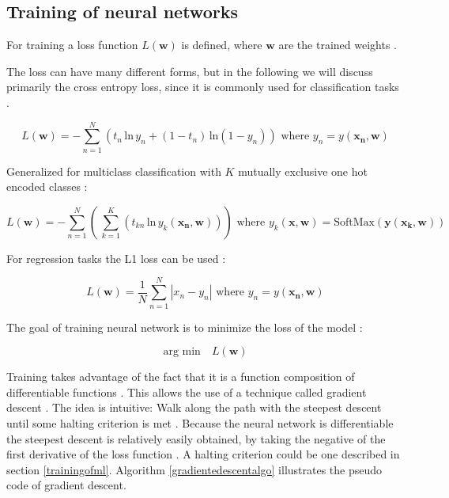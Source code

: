 \documentclass[draft,final,oneside]{vutinfth} %
\begin{document}
\subsection{Training of neural networks} \label{nntrain}

For training a loss function $L(\boldsymbol{w})$ is defined, where $\boldsymbol{w}$ are the trained weights \cite{Goodfellow-et-al-2016}.

The loss can have many different forms, but in the following we will discuss primarily the cross entropy loss, since it is commonly used for classification tasks \cite{dlvc}.

\begin{equation}
L(\boldsymbol{w}) = -\sum_{n=1}^N \left( t_n\,\text{ln}\, y_n + (1 - t_n)\,\text{ln}(1 - y_n)\right) \text{ where } 
y_n = y(\boldsymbol{x_n}, \boldsymbol{w})
\end{equation}

Generalized for multiclass classification with $K$ mutually exclusive one hot encoded classes \cite{dlvc}:

\begin{equation}
L(\boldsymbol{w}) = -\sum_{n=1}^N \left(\,\sum_{k=1}^K \left(t_{kn}\,\text{ln}\,y_k(\boldsymbol{x_n},\boldsymbol{w})\right)\right) \text{ where } y_k(\boldsymbol{x}, \boldsymbol{w}) = \text{SoftMax}(\boldsymbol{y}(\boldsymbol{x_k}, \boldsymbol{w}))
\end{equation}

For regression tasks the L1 loss can be used \cite{accuracy}:

\begin{equation}
L(\boldsymbol{w}) = \dfrac{1}{N} \sum_{n=1}^N |x_n - y_n| \text{ where } 
y_n = y(\boldsymbol{x_n}, \boldsymbol{w})
\end{equation}

The goal of training neural network is to minimize the loss of the model \cite{dlvc}:

\begin{equation}
\text{arg min}\quad L(\boldsymbol{w})
\end{equation}

Training takes advantage of the fact that it is a function composition of differentiable functions \cite{Goodfellow-et-al-2016}. This allows the use of a technique called gradient descent \cite{anintroductiontoneuralnetworks}. The idea is intuitive: Walk along the path with the steepest descent until some halting criterion is met \cite{anintroductiontoneuralnetworks}. Because the neural network is differentiable the steepest descent is relatively easily obtained, by taking the negative of the first derivative of the loss function \cite{Goodfellow-et-al-2016}. A halting criterion could be one described in section \ref{trainingofml}. Algorithm \ref{gradientedescentalgo} illustrates the pseudo code of gradient descent.
\end{document}
